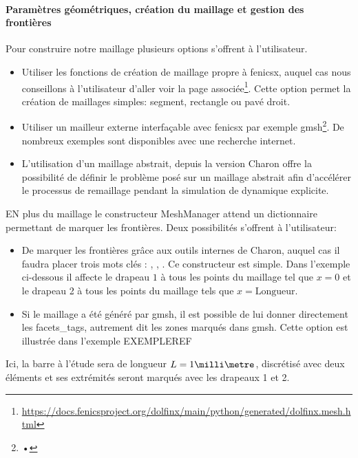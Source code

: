 \documentclass[10pt]{book}
\begin{document}
\paragraph{Paramètres géométriques, création du maillage et gestion des frontières} Pour construire notre maillage plusieurs options s'offrent à l'utilisateur. 
\begin{itemize}
\item Utiliser les fonctions de création de maillage propre à fenicsx, auquel cas nous conseillons à l'utilisateur d'aller voir la page associée\footnote{\url{https://docs.fenicsproject.org/dolfinx/main/python/generated/dolfinx.mesh.html}}. Cette option permet la création de maillages simples: segment, rectangle ou pavé droit.
\item Utiliser un mailleur externe interfaçable avec fenicsx par exemple gmsh\footnote{•}. De nombreux exemples sont disponibles avec une recherche internet.
\item L'utilisation d'un maillage abstrait, depuis la version Charon offre la possibilité de définir le problème posé sur un maillage abstrait afin d’accélérer le processus de remaillage pendant la simulation de dynamique explicite.
\end{itemize}
\begin{figure}[h!]

\end{figure}
EN plus du maillage le constructeur MeshManager attend un dictionnaire permettant de marquer les frontières. Deux possibilités s'offrent à l'utilisateur:
\begin{itemize}
\item De marquer les frontières grâce aux outils internes de Charon, auquel cas il faudra placer trois mots clés : , , . Ce constructeur est simple. Dans l'exemple ci-dessous il affecte le drapeau $1$ à tous les points du maillage tel que $x=0$ et le drapeau 2 à tous les points du maillage tels que $x=\text{Longueur}$.
\item Si le maillage a été généré par gmsh, il est possible de lui donner directement les facets\_tags, autrement dit les zones marqués dans gmsh. Cette option est illustrée dans l'exemple EXEMPLEREF
\end{itemize}
Ici, la barre à l'étude sera de longueur $L=1\milli\metre$, discrétisé avec deux éléments et ses extrémités seront marqués avec les drapeaux 1 et 2.
\end{document}
